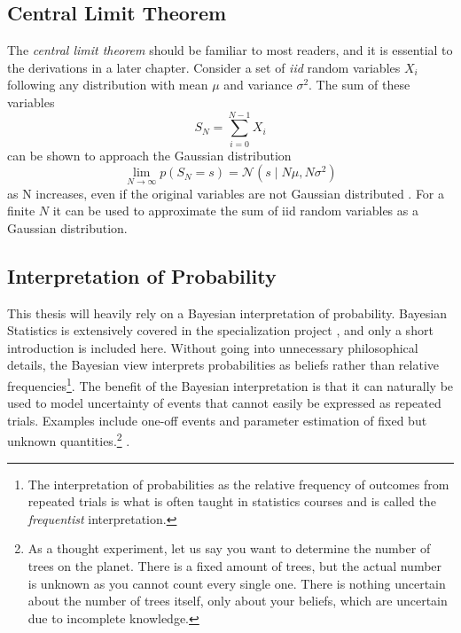 \subsection{Central Limit Theorem}\label{sec:clt}
The \textit{central limit theorem} should be familiar to most readers, and it is essential to the derivations in a later chapter. Consider a set of \textit{\acrfull{iid}} random variables $X_i$ following any distribution with mean $\mu$ and variance $\sigma^2$. The sum of these variables 
\begin{equation}
    S_N = \sum_{i=0}^{N-1} X_i
\end{equation} 
can be shown to approach the Gaussian distribution
\begin{equation}
    \lim_{N \to \infty} p(S_N=s) = \mathcal{N}(s \; | \; N \mu, N\sigma^2)
\end{equation}
as N increases, even if the original variables are not Gaussian distributed \cite{murphy}. For a finite $N$ it can be used to approximate the sum of \acrshort{iid} random variables as a Gaussian distribution.

\subsection{Interpretation of Probability}
This thesis will heavily rely on a Bayesian interpretation of probability. Bayesian Statistics is extensively covered in the specialization project \cite{mellbye}, and only a short introduction is included here. Without going into unnecessary philosophical details, the Bayesian view interprets probabilities as beliefs rather than relative frequencies\footnote{The interpretation of probabilities as the relative frequency of outcomes from repeated trials is what is often taught in statistics courses and is called the \textit{frequentist} interpretation.}. 
The benefit of the Bayesian interpretation is that it can naturally be used to model uncertainty of events that cannot easily be expressed as repeated trials. Examples include one-off events and parameter estimation of fixed but unknown quantities.\footnote{As a thought experiment, let us say you want to determine the number of trees on the planet. There is a fixed amount of trees, but the actual number is unknown as you cannot count every single one. There is nothing uncertain about the number of trees itself, only about your beliefs, which are uncertain due to incomplete knowledge.} \cite{murphy}.

